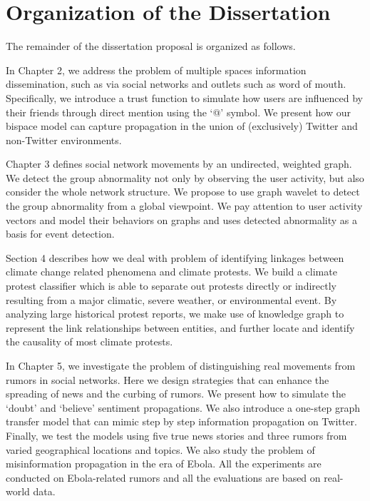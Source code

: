 \section{Organization of the Dissertation}
The remainder of the dissertation proposal is organized as follows.

In Chapter 2, we address the problem of multiple spaces information dissemination, such as via social networks and outlets such as word of mouth. Specifically, we introduce a trust function to simulate how users are influenced by their friends through direct mention using the `@' symbol. We present how our bispace model can capture propagation in the union of (exclusively) Twitter and non-Twitter environments.

Chapter 3 defines social network movements by an undirected, weighted graph. We detect the group abnormality not only by observing the user activity, but also consider the whole network structure. We propose to use graph wavelet to detect the group abnormality from a global viewpoint. We pay attention to user activity vectors and model their behaviors on graphs and uses detected abnormality as a basis for event detection.


Section 4 describes how we deal with problem of identifying linkages between climate change related
phenomena and climate protests. We build a climate protest classifier which is able to separate out protests directly or indirectly resulting from a major climatic, severe weather, or environmental event. By analyzing large historical protest reports, we make use of knowledge graph to represent the link relationships between entities, and further locate and identify the causality of most climate protests.


In Chapter 5, we investigate the problem of distinguishing real movements from rumors in social networks. Here we design strategies that can enhance the spreading of news and the curbing of rumors. We present how to simulate the `doubt' and `believe' sentiment propagations. We also introduce a one-step graph transfer model that can mimic step by step information propagation on Twitter. Finally, we test the models using five true news stories and three rumors from varied geographical locations and topics. We also study the problem of misinformation propagation in the era of Ebola. All the experiments are conducted on Ebola-related rumors and all the evaluations are based on real-world data.


